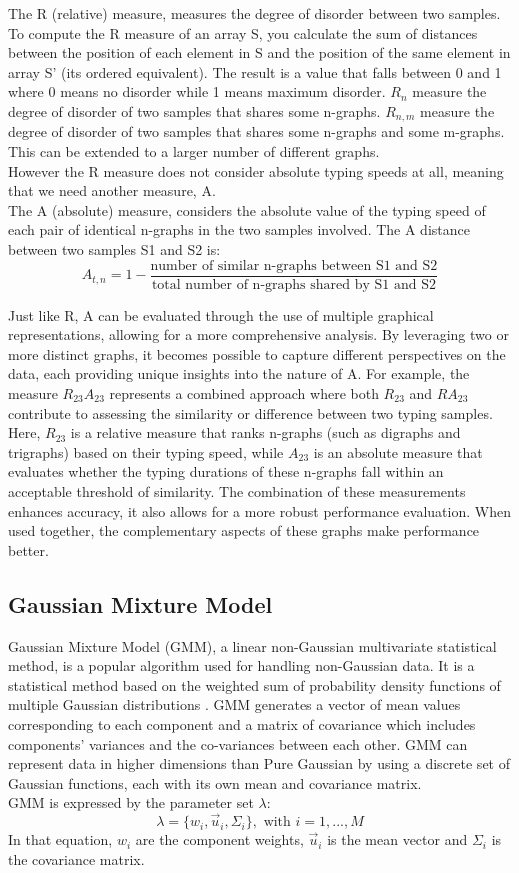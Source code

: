 The R (relative) measure, measures the degree of disorder between two samples. To compute the R measure of an array S, you calculate the sum of distances between the position of each element in S and the position of the same element in array S' (its ordered equivalent). The result is a value that falls between 0 and 1 where 0 means no disorder while 1 means maximum disorder. $R_n$ measure the degree of disorder of two samples that shares some n-graphs. $R_{n,m}$ measure the degree of disorder of two samples that shares some n-graphs and some m-graphs. This can be extended to a larger number of different graphs.\\

However the R measure does not consider absolute typing speeds at all, meaning that we need another measure, A.\\

The A (absolute) measure, considers the absolute value of the typing speed of each pair of identical n-graphs in the two samples involved. The A distance between two samples S1 and S2 is:
\begin{equation}
    A_{t,n} = 1- \frac{\text{number of similar n-graphs between S1 and S2}}{\text{total number of n-graphs shared by S1 and S2}}
\end{equation}

Just like R, A can be evaluated through the use of multiple graphical representations, allowing for a more comprehensive analysis. By leveraging two or more distinct graphs, it becomes possible to capture different perspectives on the data, each providing unique insights into the nature of A. For example, the measure $R_{23}A_{23}$ represents a combined approach where both $R_{23}$ and $RA_{23}$ contribute to assessing the similarity or difference between two typing samples. Here, $R_{23}$ is a relative measure that ranks n-graphs (such as digraphs and trigraphs) based on their typing speed, while $A_{23}$ is an absolute measure that evaluates whether the typing durations of these n-graphs fall within an acceptable threshold of similarity. The combination of these measurements enhances accuracy, it also allows for a more robust performance evaluation. When used together, the complementary aspects of these graphs make performance better.

\subsection{Gaussian Mixture Model}
Gaussian Mixture Model (GMM), a linear non-Gaussian multivariate statistical method, is a popular algorithm used for handling non-Gaussian data. It is a statistical method based on the weighted sum of probability density functions of multiple Gaussian distributions \cite{ref:gmm}. GMM generates a vector of mean values corresponding to each component and a matrix of covariance which includes components’ variances and the co-variances between each other. GMM can represent data in higher dimensions than Pure Gaussian by using a discrete set of Gaussian functions, each with its own mean and covariance matrix.\\

GMM is expressed by the parameter set $\lambda$: 
\begin{equation}
    \lambda = \{w_i,\vec{u}_i,\Sigma_i\}, \text{ with } i =1,...,M
\end{equation}
In that equation, $w_i$ are the component weights, $\vec{u}_i$ is the mean vector and $\Sigma_i$ is the covariance matrix.